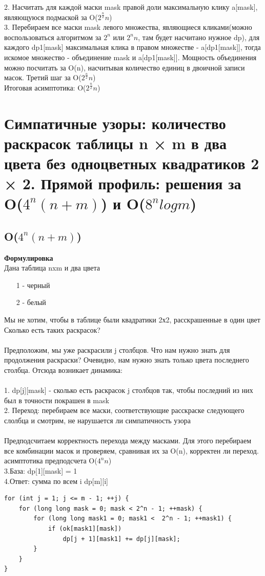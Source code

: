 2. Насчитать для каждой маски mask правой доли максимальную клику a[mask], являющуюся подмаской за O($2^{\frac{n}{2}}n$)\\
3. Перебираем все маски mask левого множества, являющиеся кликами(можно воспользоваться алгоритмом за $2^n$ или $2^n n$, там будет насчитано нужное dp), для каждого dp1[mask] максимальная клика в правом множестве - a[dp1[mask]], тогда искомое множество - объединение mask и a[dp1[mask]]. Мощность объединения можно посчитать за O(n), насчитывая количество единиц в двоичной записи масок. Третий шаг за O($2^{\frac{n}{2}}n$)
\\
Итоговая асимптотика: O($2^{\frac{n}{2}}n$)

\setcounter{section}{22}

\section{Симпатичные узоры: количество раскрасок таблицы n × m в два цвета без одноцветных квадратиков 2 × 2. Прямой профиль: решения за O($4^n(n+m)$) и O($8^nlog m$)}

\subsection*{O($4^n(n+m)$)}

\textbf{Формулировка}\\ 
Дана таблица nxm и два цвета
\begin{itemize}
    \item [1] - черный
    \item [2] - белый
\end{itemize}
Мы не хотим, чтобы в таблице были квадратики 2х2, расскрашенные в один цвет
\\ Сколько есть таких раскрасок? \\ \\
Предположим, мы уже раскрасили j столбцов. Что нам нужно знать для продолжения раскраски? Очевидно, нам нужно знать только цвета последнего столбца. Отсюда возникает динамика:
\\
\\1. dp[j][mask] - сколько есть раскрасок j  столбцов так, чтобы последний из них был в точности покрашен в mask\\
2. Переход: перебираем все маски, соответствующие расскраске следующего слолбца и смотрим, не нарушается ли симпатичность узора 
\\
\\
Предподсчитаем корректность перехода между масками. Для этого перебираем все комбинации масок и проверяем, сравнивая их за O(n), корректен ли переход. асимптотика предподсчета O($4^n n$)
\\
3.База: dp[1][mask] = 1\\
4.Ответ: сумма по всем i dp[m][i]
\\
\begin{lstlisting}
for (int j = 1; j <= m - 1; ++j) {
	for (long long mask = 0; mask < 2^n - 1; ++mask) {
		for (long long mask1 = 0; mask1 <  2^n - 1; ++mask1) {
			if (ok[mask1][mask])
				dp[j + 1][mask1] += dp[j][mask];
		}
	}
}
\end{lstlisting}

